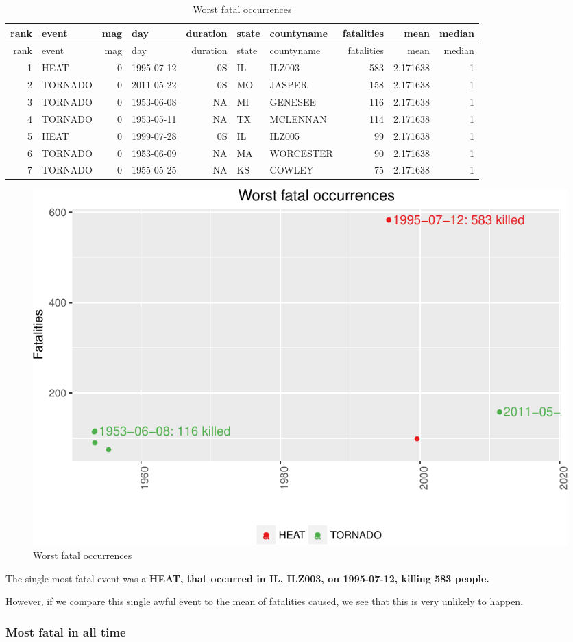 \documentclass[]{article}
\begin{document}
\begin{longtable}[]{@{}rlrlrllrrr@{}}
\caption{Worst fatal occurrences}\tabularnewline
\toprule
rank & event & mag & day & duration & state & countyname & fatalities &
mean & median\tabularnewline
\midrule
\endfirsthead
\toprule
rank & event & mag & day & duration & state & countyname & fatalities &
mean & median\tabularnewline
\midrule
\endhead
1 & HEAT & 0 & 1995-07-12 & 0S & IL & ILZ003 & 583 & 2.171638 &
1\tabularnewline
2 & TORNADO & 0 & 2011-05-22 & 0S & MO & JASPER & 158 & 2.171638 &
1\tabularnewline
3 & TORNADO & 0 & 1953-06-08 & NA & MI & GENESEE & 116 & 2.171638 &
1\tabularnewline
4 & TORNADO & 0 & 1953-05-11 & NA & TX & MCLENNAN & 114 & 2.171638 &
1\tabularnewline
5 & HEAT & 0 & 1999-07-28 & 0S & IL & ILZ005 & 99 & 2.171638 &
1\tabularnewline
6 & TORNADO & 0 & 1953-06-09 & NA & MA & WORCESTER & 90 & 2.171638 &
1\tabularnewline
7 & TORNADO & 0 & 1955-05-25 & NA & KS & COWLEY & 75 & 2.171638 &
1\tabularnewline
\bottomrule
\end{longtable}

\begin{figure}[htbp]
\centering
\includegraphics{readme_files/figure-latex/fatal-plot-single-1.pdf}
\caption{Worst fatal occurrences}
\end{figure}

The single most fatal event was a \textbf{HEAT, that occurred in IL,
ILZ003, on 1995-07-12, killing 583 people.}

However, if we compare this single awful event to the mean of fatalities
caused, we see that this is very unlikely to happen.

\subsubsection{Most fatal in all time}\label{most-fatal-in-all-time}
\end{document}
